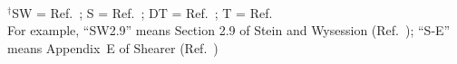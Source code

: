 \documentclass[10pt,titlepage,fleqn]{article}
\begin{document}
\begin{enumerate}
\begin{tabular}{cl|l|l|ll}
\hline
\end{tabular} \\
$^\dagger$SW = Ref.~\cite{SteinWysession}; S = Ref.~\cite{ShearerE2}; DT = Ref.~\cite{DT}; T = Ref.~\cite{Tarantola2005} \\
For example, ``SW2.9'' means Section 2.9 of Stein and Wysession (Ref.~\cite{SteinWysession}); ``S-E'' means Appendix~E of Shearer (Ref.~\cite{ShearerE2})


\end{enumerate}
\end{document}
